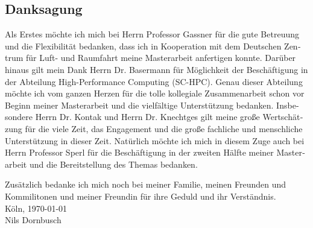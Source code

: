 \documentclass[12pt,a4paper,twoside, open=right]{scrreprt}
\theoremstyle{definition}
\theoremstyle{plain}
\begin{document}
\begin{otherlanguage}{ngerman}
  

\chapter*{Danksagung}
Als Erstes möchte ich mich bei Herrn Professor Gassner für die gute Betreuung und die Flexibilität bedanken, dass ich in Kooperation mit dem Deutschen Zentrum für Luft- und Raumfahrt meine Masterarbeit anfertigen konnte. Darüber hinaus gilt mein Dank Herrn Dr. Basermann für Möglichkeit der Beschäftigung in der Abteilung High-Performance Computing (SC-HPC). Genau dieser Abteilung möchte ich vom ganzen Herzen für die tolle kollegiale Zusammenarbeit schon vor Beginn meiner Masterarbeit und die vielfältige Unterstützung bedanken. Insbesondere Herrn Dr. Kontak und Herrn Dr. Knechtges gilt meine große Wertschätzung für die viele Zeit, das Engagement und die große fachliche und menschliche Unterstützung in dieser Zeit. Natürlich möchte ich mich in diesem Zuge auch bei Herrn Professor Sperl für die Beschäftigung in der zweiten Hälfte meiner Masterarbeit und die Bereitstellung des Themas bedanken. \par
Zusätzlich bedanke ich mich noch bei meiner Familie, meinen Freunden und Kommilitonen und meiner Freundin für ihre Geduld und ihr Verständnis.
\\[1cm]
Köln, \today 
\\[1cm]
Nils Dornbusch
\end{otherlanguage}
\newpage
\tableofcontents
\newpage
\end{document}
